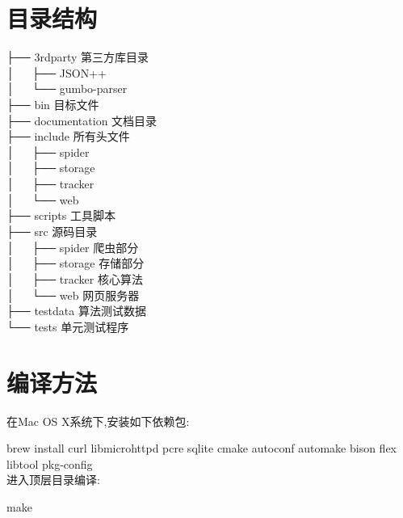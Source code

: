 \documentclass[12pt]{article}
\begin{document}
\section{目录结构}
\noindent
├── 3rdparty   第三方库目录\\
│\verb|   |├── JSON++\\
│\verb|   |└── gumbo-parser\\
├── bin   目标文件\\
├── documentation  文档目录\\
├── include  所有头文件\\
│\verb|   |├── spider\\
│\verb|   |├── storage\\
│\verb|   |├── tracker\\
│\verb|   |└── web\\
├── scripts  工具脚本\\
├── src  源码目录\\
│\verb|   |├── spider  爬虫部分\\
│\verb|   |├── storage   存储部分\\
│\verb|   |├── tracker  核心算法\\
│\verb|   |└── web  网页服务器\\
├── testdata  算法测试数据\\
└── tests  单元测试程序\\


\section{编译方法}

在Mac OS X系统下,安装如下依赖包: 

brew install curl libmicrohttpd pcre sqlite cmake autoconf automake bison flex libtool pkg-config\\

进入顶层目录编译:

make

\end{document}
